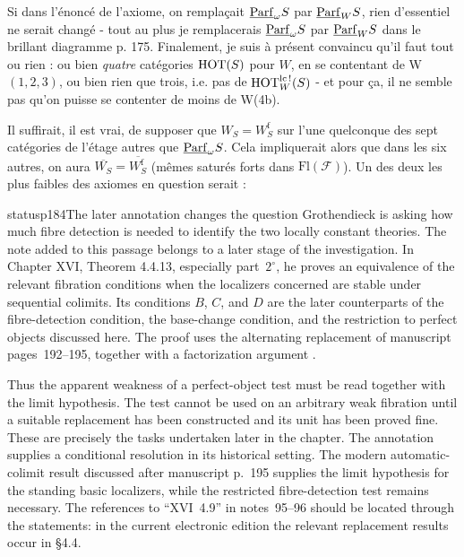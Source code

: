 Si dans l'énoncé de l'axiome, on remplaçait $\underline{\mathrm{Parf}}_\omega S$ par $\underline{\mathrm{Parf}}_W S$, rien d'essentiel ne serait changé - tout au plus je remplacerais $\underline{\mathrm{Parf}}_\omega S$ par $\underline{\mathrm{Parf}}_W S$ dans le brillant diagramme p. 175. Finalement, je suis à présent convaincu qu'il faut tout ou rien : ou bien \textit{quatre} catégories $\mathrm{HOT}(S)$ pour $W$, en se contentant de W$(1,2,3)$, ou bien rien que trois, i.e. pas de $\mathrm{HOT}^{\mathrm{lc}\,!}_W(S)$ - et pour ça, il ne semble pas qu'on puisse se contenter de moins de W(4b).

Il suffirait, il est vrai, de supposer que $W_S = W^{\mathrm{f}}_S$ sur l'une quelconque des sept catégories de l'étage autres que $\underline{\mathrm{Parf}}_\omega S$. Cela impliquerait alors que dans les six autres, on aura $\overline{W_S} = \overline{W^{\mathrm{f}}_S}$ (mêmes saturés forts dans $\mathrm{Fl}(\mathcal{F})$). Un des deux les plus faibles des axiomes en question serait : %

\begin{dcomment}{status}{p184}{The later annotation changes the question}
Grothendieck is asking how much fibre detection is needed to identify the two locally constant theories. The note added to this passage belongs to a later stage of the investigation. In Chapter XVI, Theorem 4.4.13, especially part~$2^\circ$, he proves an equivalence of the relevant fibration conditions when the localizers concerned are stable under sequential colimits. Its conditions $B$, $C$, and $D$ are the later counterparts of the fibre-detection condition, the base-change condition, and the restriction to perfect objects discussed here. The proof uses the alternating replacement of manuscript pages~192--195, together with a factorization argument \citep[\S4.4, especially Corollaries~4.4.10--4.4.12 and Theorem~4.4.13]{Grothendieck1991XVI}.

Thus the apparent weakness of a perfect-object test must be read together with the limit hypothesis. The test cannot be used on an arbitrary weak fibration until a suitable replacement has been constructed and its unit has been proved fine. These are precisely the tasks undertaken later in the chapter. The annotation supplies a conditional resolution in its historical setting. The modern automatic-colimit result discussed after manuscript p.~195 supplies the limit hypothesis for the standing basic localizers, while the restricted fibre-detection test remains necessary. The references to ``XVI~4.9'' in notes~95--96 should be located through the statements: in the current electronic edition the relevant replacement results occur in \S4.4.
\end{dcomment}


